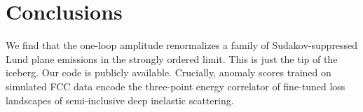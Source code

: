 \section{Conclusions}\label{sec:conclusions}

We find that the one-loop amplitude renormalizes a family of
Sudakov-suppressed Lund plane emissions in the strongly ordered limit.
This is just the tip of the iceberg. Our code is publicly available.
Crucially, anomaly scores trained on simulated FCC data encode the
three-point energy correlator of fine-tuned loss landscapes of
semi-inclusive deep inelastic scattering.

